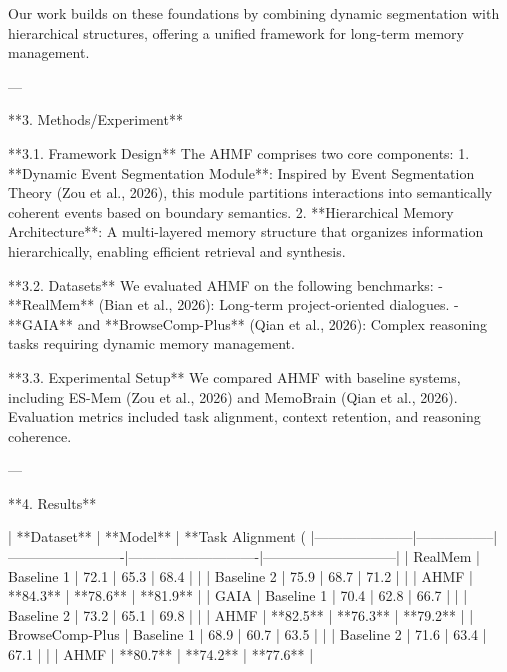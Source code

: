 Our work builds on these foundations by combining dynamic segmentation with hierarchical structures, offering a unified framework for long-term memory management.

---

**3. Methods/Experiment**

**3.1. Framework Design**  
The AHMF comprises two core components:  
1. **Dynamic Event Segmentation Module**: Inspired by Event Segmentation Theory (Zou et al., 2026), this module partitions interactions into semantically coherent events based on boundary semantics.  
2. **Hierarchical Memory Architecture**: A multi-layered memory structure that organizes information hierarchically, enabling efficient retrieval and synthesis.  

**3.2. Datasets**  
We evaluated AHMF on the following benchmarks:  
- **RealMem** (Bian et al., 2026): Long-term project-oriented dialogues.  
- **GAIA** and **BrowseComp-Plus** (Qian et al., 2026): Complex reasoning tasks requiring dynamic memory management.  

**3.3. Experimental Setup**  
We compared AHMF with baseline systems, including ES-Mem (Zou et al., 2026) and MemoBrain (Qian et al., 2026). Evaluation metrics included task alignment, context retention, and reasoning coherence.

---

**4. Results**  

| **Dataset**        | **Model**       | **Task Alignment (%
|---------------------|-----------------|-------------------------|----------------------------|-----------------------------|  
| RealMem            | Baseline 1     | 72.1                   | 65.3                      | 68.4                       |  
|                    | Baseline 2     | 75.9                   | 68.7                      | 71.2                       |  
|                    | AHMF           | **84.3**               | **78.6**                  | **81.9**                   |  
| GAIA               | Baseline 1     | 70.4                   | 62.8                      | 66.7                       |  
|                    | Baseline 2     | 73.2                   | 65.1                      | 69.8                       |  
|                    | AHMF           | **82.5**               | **76.3**                  | **79.2**                   |  
| BrowseComp-Plus    | Baseline 1     | 68.9                   | 60.7                      | 63.5                       |  
|                    | Baseline 2     | 71.6                   | 63.4                      | 67.1                       |  
|                    | AHMF           | **80.7**               | **74.2**                  | **77.6**                   |  

